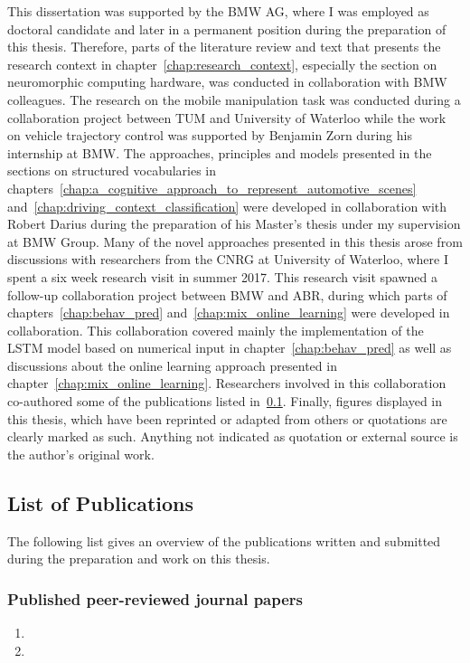 This dissertation was supported by the \ac{BMW} AG, where I was employed as doctoral candidate and later in a permanent position during the preparation of this thesis.
Therefore, parts of the literature review and text that presents the research context in chapter~\ref{chap:research_context}, especially the section on neuromorphic computing hardware, was conducted in collaboration with \ac{BMW} colleagues.
The research on the mobile manipulation task was conducted during a collaboration project between \ac{TUM} and University of Waterloo while the work on vehicle trajectory control was supported by Benjamin Zorn during his internship at \ac{BMW}.
The approaches, principles and models presented in the sections on structured vocabularies in chapters~\ref{chap:a_cognitive_approach_to_represent_automotive_scenes} and~\ref{chap:driving_context_classification} were developed in collaboration with Robert Darius during the preparation of his Master's thesis \parencite{Darius2018} under my supervision at \ac{BMW} Group.
Many of the novel approaches presented in this thesis arose from discussions with researchers from the \ac{CNRG} at University of Waterloo, where I spent a six week research visit in summer 2017.
This research visit spawned a follow-up collaboration project between \ac{BMW} and \acf{ABR}, during which parts of chapters~\ref{chap:behav_pred} and~\ref{chap:mix_online_learning} were developed in collaboration.
This collaboration covered mainly the implementation of the \ac{LSTM} model based on numerical input in chapter~\ref{chap:behav_pred} as well as discussions about the online learning approach presented in chapter~\ref{chap:mix_online_learning}.
Researchers involved in this collaboration co-authored some of the publications listed in~\ref{subsec:list_of_publications}.
Finally, figures displayed in this thesis, which have been reprinted or adapted from others or quotations are clearly marked as such.
Anything not indicated as quotation or external source is the author's original work.

\subsection{List of Publications}%
\label{subsec:list_of_publications}

The following list gives an overview of the publications written and submitted during the preparation and work on this thesis.

\subsubsection{Published peer-reviewed journal papers}
\begin{enumerate}
	\item {}
	\item {}
\end{enumerate}

